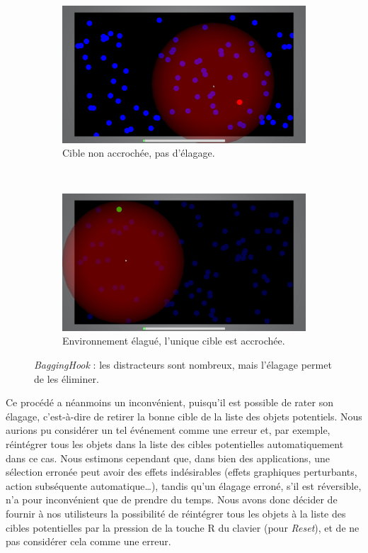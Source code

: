 	\begin{figure}[htb]
		\begin{subfigure}[t]{0.49\textwidth}
			\centering
			\includegraphics[width=\textwidth]{figures/ch5/baggingHook_init}
			\caption{Cible non accrochée, pas d'élagage.}
			\label{fig:baggingHook_init}
		\end{subfigure}
		~
		\begin{subfigure}[t]{0.49\textwidth}
			\centering
			\includegraphics[width=\textwidth]{figures/ch5/baggingHook_culled}
			\caption{Environnement élagué, l'unique cible est accrochée.}
			\label{fig:baggingHook_culled}
		\end{subfigure}
		\caption[Évaluation de \emph{BaggingHook}]{\emph{BaggingHook} : les distracteurs sont nombreux, mais l'élagage permet de les éliminer.}
		\label{fig:baggingHookPix}
	\end{figure}
	
	Ce procédé a néanmoins un inconvénient, puisqu'il est possible de \og rater \fg{} son élagage, c'est-à-dire de retirer la bonne cible de la liste des objets potentiels. Nous aurions pu considérer un tel événement comme une erreur et, par exemple, réintégrer tous les objets dans la liste des cibles potentielles automatiquement dans ce cas. Nous estimons cependant que, dans bien des applications, une sélection erronée peut avoir des effets indésirables (effets graphiques perturbants, action subséquente automatique\ldots{}), tandis qu'un élagage erroné, s'il est réversible, n'a pour inconvénient que de prendre du temps. Nous avons donc décider de fournir à nos utilisteurs la possibilité de réintégrer tous les objets à la liste des cibles potentielles par la pression de la touche R du clavier (pour \emph{Reset}), et de ne pas considérer cela comme une erreur.
	
